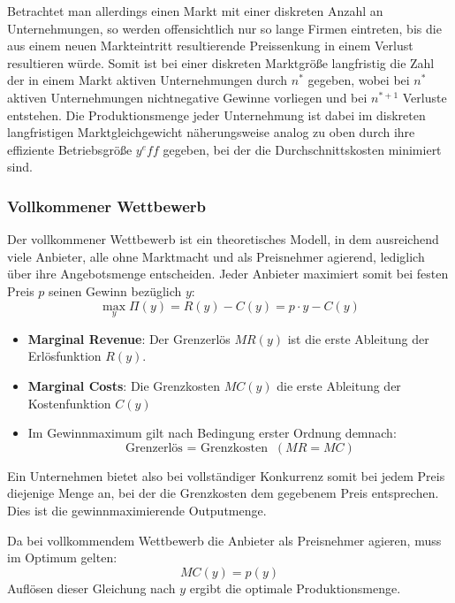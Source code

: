 Betrachtet man allerdings einen Markt mit einer diskreten Anzahl an Unternehmungen, so werden offensichtlich nur so lange Firmen eintreten, bis die aus einem neuen Markteintritt resultierende Preissenkung in einem Verlust resultieren würde. Somit ist bei einer diskreten Marktgröße langfristig die Zahl der in einem Markt aktiven Unternehmungen durch $n^*$ gegeben, wobei bei $n^*$ aktiven Unternehmungen nichtnegative Gewinne vorliegen und bei $n^{*+1}$ Verluste entstehen. Die Produktionsmenge jeder Unternehmung ist dabei im diskreten langfristigen Marktgleichgewicht näherungsweise analog zu oben durch ihre effiziente Betriebsgröße $y^eff$ gegeben, bei der die Durchschnittskosten minimiert sind.

\subsubsection*{Vollkommener Wettbewerb}

Der vollkommener Wettbewerb ist ein theoretisches Modell, in dem ausreichend viele Anbieter, alle ohne Marktmacht und als Preisnehmer agierend, lediglich über ihre Angebotsmenge entscheiden. Jeder Anbieter maximiert somit bei festen Preis $p$ seinen Gewinn bezüglich $y$:
	$$ \max_y \Pi(y) = R(y) - C(y) = p \cdot y - C(y) $$
	
\begin{itemize}
	\item \textbf{Marginal Revenue}: Der Grenzerlös $MR(y)$ ist die erste Ableitung der Erlösfunktion $R(y)$.
	\item \textbf{Marginal Costs}: Die Grenzkosten $MC(y)$ die erste Ableitung der Kostenfunktion $C(y)$
	\item Im Gewinnmaximum gilt nach Bedingung erster Ordnung demnach: 
		$$ \text{Grenzerlös = Grenzkosten }~ (MR = MC) $$
\end{itemize}

Ein Unternehmen bietet also bei vollständiger Konkurrenz somit bei jedem Preis diejenige Menge an, bei der die Grenzkosten dem gegebenem Preis entsprechen. Dies ist die gewinnmaximierende Outputmenge.

\begin{kr}
	Da bei vollkommendem Wettbewerb die Anbieter als Preisnehmer agieren, muss im Optimum gelten:
	$$ MC(y) = p(y) $$
	Auflösen dieser Gleichung nach $y$ ergibt die optimale Produktionsmenge.
\end{kr} 

